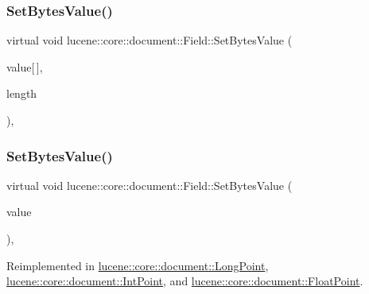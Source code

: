 \subsubsection{\texorpdfstring{Set\+Bytes\+Value()}{SetBytesValue()}\hspace{0.1cm}{\footnotesize\ttfamily [1/3]}}
{\footnotesize\ttfamily virtual void lucene\+::core\+::document\+::\+Field\+::\+Set\+Bytes\+Value (\begin{DoxyParamCaption}\item[{const char}]{value\mbox{[}$\,$\mbox{]},  }\item[{const uint32\+\_\+t}]{length }\end{DoxyParamCaption})\hspace{0.3cm}{\ttfamily [inline]}, {\ttfamily [virtual]}}

\mbox{\label{classlucene_1_1core_1_1document_1_1Field_a41d077e63ce6fae8677b8df6b29821bd}} 
\subsubsection{\texorpdfstring{Set\+Bytes\+Value()}{SetBytesValue()}\hspace{0.1cm}{\footnotesize\ttfamily [2/3]}}
{\footnotesize\ttfamily virtual void lucene\+::core\+::document\+::\+Field\+::\+Set\+Bytes\+Value (\begin{DoxyParamCaption}\item[{const \mbox{\hyperlink{classlucene_1_1core_1_1util_1_1BytesRef}{lucene\+::core\+::util\+::\+Bytes\+Ref}} \&}]{value }\end{DoxyParamCaption})\hspace{0.3cm}{\ttfamily [inline]}, {\ttfamily [virtual]}}



Reimplemented in \mbox{\hyperlink{classlucene_1_1core_1_1document_1_1LongPoint_a3ba17f0b827e583a9b568e368dd798ac}{lucene\+::core\+::document\+::\+Long\+Point}}, \mbox{\hyperlink{classlucene_1_1core_1_1document_1_1IntPoint_a288c85e2568bf186de1dac119c91ae2f}{lucene\+::core\+::document\+::\+Int\+Point}}, and \mbox{\hyperlink{classlucene_1_1core_1_1document_1_1FloatPoint_a8862567e2ebfd0b8192eaec0967a943a}{lucene\+::core\+::document\+::\+Float\+Point}}.

